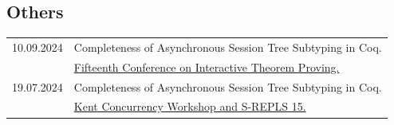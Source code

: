 \documentclass[a4paper,9pt]{article} %
\begin{document}
\subsection*{Others}
\begin{longtable}{ll}	
{\normalsize 10.09.2024} & {Completeness of Asynchronous Session Tree Subtyping in Coq.}\\
&
 \href{https://www.viam.science.tsu.ge/itp2024/program}{Fifteenth Conference on Interactive Theorem Proving.}\\[0.25cm]
 
{\normalsize 19.07.2024} & {Completeness of Asynchronous Session Tree Subtyping in Coq.}\\
&
 \href{https://cw-srepls-24.github.io/}{Kent Concurrency Workshop and S-REPLS 15.}\\[0.25cm]


\end{longtable}
\end{document}
